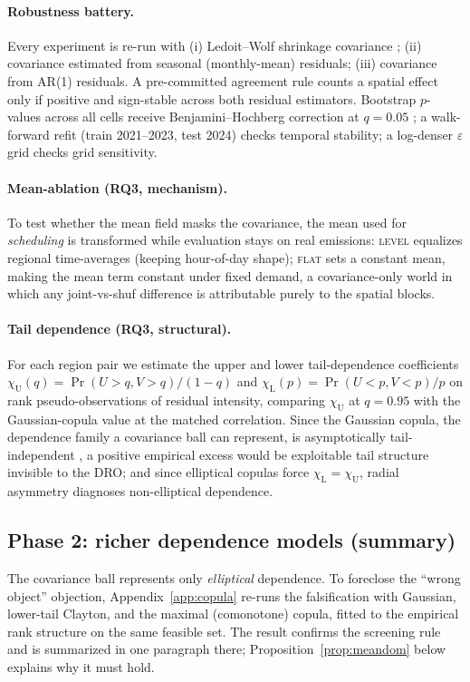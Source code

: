 \documentclass[10pt,twocolumn]{article}
\newcommand{\chiU}{\chi_{\mathrm{U}}}
\newcommand{\chiL}{\chi_{\mathrm{L}}}
\begin{document}
\paragraph{Robustness battery.} Every experiment is re-run with (i) Ledoit--Wolf
shrinkage covariance \citep{ledoit2004}; (ii) covariance estimated from seasonal
(monthly-mean) residuals; (iii) covariance from AR(1) residuals. A pre-committed
agreement rule counts a spatial effect only if positive and sign-stable across
both residual estimators. Bootstrap $p$-values across all cells receive
Benjamini--Hochberg correction at $q=0.05$ \citep{benjamini1995}; a walk-forward
refit (train 2021--2023, test 2024) checks temporal stability; a log-denser
$\varepsilon$ grid checks grid sensitivity.

\paragraph{Mean-ablation (RQ3, mechanism).} To test whether the mean field masks the
covariance, the mean used for \emph{scheduling} is transformed while evaluation
stays on real emissions: \textsc{level} equalizes regional time-averages (keeping
hour-of-day shape); \textsc{flat} sets a constant mean, making the mean term
constant under fixed demand, a covariance-only world in which any joint-vs-shuf
difference is attributable purely to the spatial blocks.

\paragraph{Tail dependence (RQ3, structural).} For each region pair we estimate
the upper and lower tail-dependence coefficients
$\chiU(q)=\Pr(U>q,V>q)/(1-q)$ and $\chiL(p)=\Pr(U<p,V<p)/p$ on rank
pseudo-observations of residual intensity, comparing $\chiU$ at $q=0.95$ with the
Gaussian-copula value at the matched correlation. Since the Gaussian copula, the dependence family a covariance ball can represent, is asymptotically
tail-independent \citep{embrechts2002}, a positive empirical excess would be
exploitable tail structure invisible to the DRO; and since elliptical copulas force
$\chiL=\chiU$, radial asymmetry diagnoses non-elliptical dependence.

\subsection{Phase 2: richer dependence models (summary)}\label{sec:method-copula}
The covariance ball represents only \emph{elliptical} dependence. To foreclose the
``wrong object'' objection, Appendix~\ref{app:copula} re-runs the falsification with
Gaussian, lower-tail Clayton, and the maximal (comonotone) copula, fitted to the
empirical rank structure on the same feasible set. The result confirms the screening
rule and is summarized in one paragraph there; Proposition~\ref{prop:meandom} below
explains why it must hold.
\end{document}
